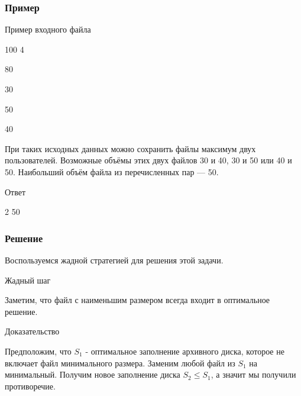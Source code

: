 \documentclass{beamer}
\begin{document}
\begin{frame}

    \frametitle{Пример}

    \begin{block}{Пример входного файла}

        100 4

        80

        30

        50

        40

    \end{block}

    При таких исходных данных можно сохранить файлы максимум двух пользователей. Возможные объёмы этих двух файлов \alert{30 и 40}, \alert{30 и 50} или \alert{40 и 50}. Наибольший объём файла из перечисленных пар — \alert{50}.

    \begin{alertblock}{Ответ}

        2 50

    \end{alertblock}

\end{frame}

\begin{frame}

    \frametitle{Решение}

    Воспользуемся \alert{жадной} стратегией для решения этой задачи.

    \pause

    \begin{alertblock}{Жадный шаг}

        Заметим, что файл с наименьшим размером всегда входит в оптимальное решение.

    \end{alertblock}

    \pause

    \begin{block}{Доказательство}

        Предположим, что $S_1$ - оптимальное заполнение архивного диска, которое не включает файл минимального размера. Заменим любой файл из $S_1$ на минимальный. Получим новое заполнение диска $S_2 \leq S_1$, а значит мы получили противоречие. 

    \end{block}

\end{frame}
\end{document}
